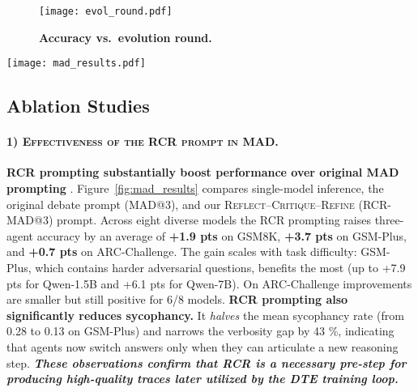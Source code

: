 \documentclass[11pt]{article}
\begin{document}
\begin{figure}[t]
    \centering
    \texttt{[image: evol\_round.pdf]}
    \caption{\textbf{Accuracy vs.\ evolution round.} }
    \label{fig:evo_curve}
\end{figure}







\begin{figure*}[ht]
    \centering
    \texttt{[image: mad\_results.pdf]}
    \caption{Results (\%) on: GSM8K, GSM-PLUS, and ARC-Challenge datasets. Performance is compared across three evaluation settings: single model inference, the Original Multi-Agent Debate (MAD@3) prompt, and our proposed RCR (RCR-MAD (Ours)@3) prompting.}
    \label{fig:mad_results}
\end{figure*}

\subsection{Ablation Studies}
\label{sec:ablation}



\paragraph{\textsc{1) Effectiveness of the RCR prompt in MAD.}} \textbf{RCR prompting substantially boost performance over original MAD prompting} \cite{du2023improving}. Figure~\ref{fig:mad_results} compares single-model inference, the original debate prompt (MAD@3), and our \textsc{Reflect–Critique–Refine} (RCR-MAD@3) prompt. Across eight diverse models the RCR prompting raises three-agent accuracy by an average of \textbf{+1.9 pts} on GSM8K, \textbf{+3.7 pts} on GSM-Plus, and \textbf{+0.7 pts} on ARC-Challenge. The gain scales with task difficulty: GSM-Plus, which contains harder adversarial questions, benefits the most (up to +7.9 pts for Qwen-1.5B and +6.1 pts for Qwen-7B). On ARC-Challenge improvements are smaller but still positive for 6/8 models. \textbf{RCR prompting also significantly reduces sycophancy.} It \emph{halves} the mean sycophancy rate (from 0.28 to 0.13 on GSM-Plus) and narrows the verbosity gap by 43 \%, indicating that agents now switch answers only when they can articulate a new reasoning step. \textbf{\textit{These observations confirm that RCR is a necessary pre-step for producing high-quality traces later utilized by the DTE training loop.}}
\end{document}
